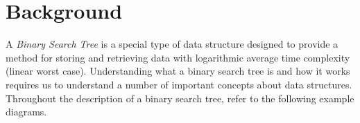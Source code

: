 	\blankpage

	\thispagestyle{empty}
	\tableofcontents

	\pagebreak

	\section{Background}
		A \emph{Binary Search Tree} is a special type of data structure designed to provide a method for storing and retrieving data with logarithmic average time complexity (linear worst case). Understanding what a binary search tree is and how it works requires us to understand a number of important concepts about data structures. Throughout the description of a binary search tree, refer to the following example diagrams.\\[\baselineskip]
